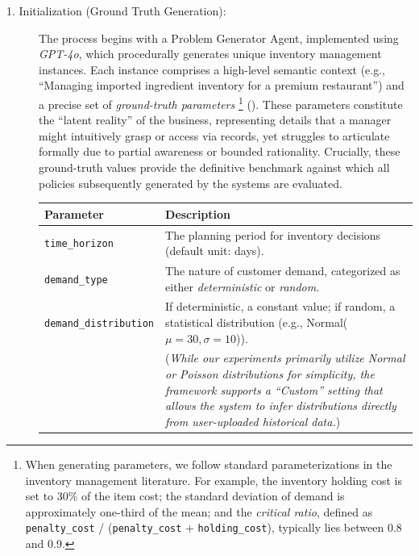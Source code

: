 \documentclass[mnsc,nonblindrev]{informs3_hide}
\begin{document}
\begin{description}
    \item[1. Initialization (Ground Truth Generation):]
    The process begins with a {Problem Generator Agent}, implemented using \emph{GPT-4o}, which procedurally generates unique inventory management instances. Each instance comprises a high-level semantic context (e.g., ``Managing imported ingredient inventory for a premium restaurant'') and a precise set of \textit{ground-truth parameters} \footnote{When generating parameters, we follow standard parameterizations in the inventory management literature. For example, the inventory holding cost is set to 30\% of the item cost; the standard deviation of demand is approximately one-third of the mean; and the \emph{critical ratio}, defined as \texttt{penalty\_cost} / (\texttt{penalty\_cost} + \texttt{holding\_cost}), typically lies between 0.8 and 0.9.} (). These parameters constitute the ``latent reality'' of the business, representing details that a manager might intuitively grasp or access via records, yet struggles to articulate formally due to partial awareness or bounded rationality. Crucially, these ground-truth values provide the definitive benchmark against which all policies subsequently generated by the systems are evaluated.



    \begin{table}[!ht]
    \centering
    \renewcommand{\arraystretch}{1.2}
    \begin{tabular}{
        >{\raggedright\arraybackslash}p{}
        >{\raggedright\arraybackslash}p{}
    }
        \toprule
        \textbf{Parameter} & \textbf{Description} \\
        \midrule
        \texttt{time\_horizon} &
        The planning period for inventory decisions (default unit: days). \\

        \texttt{demand\_type} &
        The nature of customer demand, categorized as either \textit{deterministic} or \textit{random}. \\

        \texttt{demand\_distribution} &
        If deterministic, a constant value; if random, a statistical distribution (e.g., Normal($\mu=30, \sigma=10$)). \\
        & {\footnotesize (\emph{While our experiments primarily utilize Normal or Poisson distributions for simplicity, the framework supports a ``Custom'' setting that allows the system to infer distributions directly from user-uploaded historical data.})} \\


\end{tabular}
\end{table}
\end{description}
\end{document}
